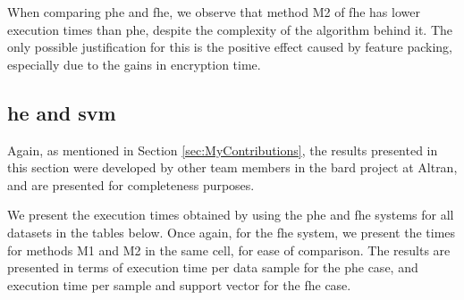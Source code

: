 When comparing \ac{phe} and \ac{fhe}, we observe that method M2 of \ac{fhe} has lower execution times than \ac{phe}, despite the complexity of the algorithm behind it. The only possible justification for this is the positive effect caused by feature packing, especially due to the gains in encryption time.




\subsection{\acl{he} and \acl{svm}}
\label{ssec:exec_he_svm}

\vspace*{-0.4cm}
Again, as mentioned in Section \ref{sec:MyContributions}, the results presented in this section were developed by other team members in the \ac{bard} project at Altran, and are presented for completeness purposes.

\vspace*{-0.2cm}
We present the execution times obtained by using the \ac{phe} and \ac{fhe} systems for all datasets in the tables below. Once again, for the \ac{fhe} system, we present the times for methods M1 and M2 in the same cell, for ease of comparison. The results are presented in terms of execution time per data sample for the \ac{phe} case, and execution time per sample and support vector for the \ac{fhe} case.

